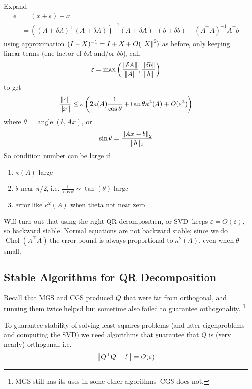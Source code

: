 \documentclass[11pt]{article}
\numberwithin{equation}{section}
\begin{document}
Expand \begin{align*}
    e &= (x+e) - x  \\
    &= \left( (A+\delta A)^\top (A+\delta A) \right)^{-1} (A+\delta A)^\top (b+\delta b) - (A^\top A)^{-1}A^\top b
\end{align*}
using approximation $(I-X)^{-1}=I+X+O(\left\| X \right\|^2)$ as before, only keeping linear terms (one factor of $\delta A$ and/or $\delta b$), call \begin{align*}
    \varepsilon = \max\left( \frac{\left\| \delta A \right\|}{\left\| A \right\|}, \frac{\left\| \delta b \right\|}{\left\| b \right\|} \right)
\end{align*} to get \begin{align*}
    \frac{\left\| e \right\|}{\left\| x \right\|} \leq \varepsilon \left( 2 \kappa (A) \frac{1}{\cos \theta} + \tan \theta \kappa^2(A) + O(\varepsilon^2) \right)
\end{align*}
where $\theta=\operatorname{angle}(b, Ax)$, or \begin{align*}
    \sin \theta = \frac{\left\| Ax-b \right\|_2}{\|b\|_{2}}
\end{align*}
So condition number can be large if \begin{enumerate}
    \item $\kappa(A)$ large
    \item $\theta$ near $\pi/2$, i.e. $\frac{1}{\cos \theta} \sim \tan(\theta)$ large
    \item error like $\kappa^2(A)$ when theta not near zero
\end{enumerate}

Will turn out that using the right QR decomposition, or SVD, keeps $\varepsilon = O(\varepsilon)$, so backward stable. 
Normal equations are not backward stable; since we do $\operatorname{Chol}(A^\top A)$ the error bound is always proportional to $\kappa^2(A)$, even when $\theta$ small.

\subsection{Stable Algorithms for QR Decomposition}
Recall that MGS and CGS produced $Q$ that were far from orthogonal, and running them twice helped but sometime also failed to guarantee orthogonality.
\footnote{MGS still has its uses in some other algorithms, CGS does not.}

To guarantee stability of solving least squares problems (and later eigenproblems and computing the SVD) we need algorithms that guarantee that $Q$ is (very nearly) orthogonal, 
i.e. \begin{align*}
    \left\| Q^\top Q - I \right\| = O(\varepsilon)
\end{align*}
\end{document}

